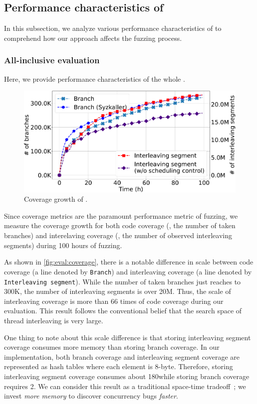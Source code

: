 \subsection{Performance characteristics of \sys}
\label{ss:characteristics}

In this subsection, we analyze various performance characteristics of
\sys to comprehend how our approach affects the fuzzing process.
%
\subsubsection{All-inclusive evaluation}
\label{sss:allinclusive}

Here, we provide performance characteristics of the whole \sys.


%
\begin{figure}[t]
  \centering
  \includegraphics[width=0.9\linewidth]{fig/coverage_graph-crop.pdf}
  \caption{Coverage growth of \sys.}
  \label{fig:eval:coverage}
\end{figure}
%
Since coverage metrics are the paramount performance metric of
fuzzing, we measure the coverage growth for both code coverage (\ie,
the number of taken branches) and interelaving coverage (\ie, the
number of observed interleaving segments) during 100 hours of fuzzing.

As shown in \autoref{fig:eval:coverage}, there is a notable difference
in scale between code coverage (a line denoted by \texttt{Branch}) and
interleaving coverage (a line denoted by \texttt{Interleaving segment}).
%
While the number of taken branches just reaches to 300K, the number of
interleaving segments is over 20M. Thus, the scale of interleaving
coverage is more than 66 times of code coverage during our evaluation.
%
This result follows the conventional belief that the search space of
thread interleaving is very large.

One thing to note about this scale difference is that storing
interleaving segment coverage consumes more memory than storing branch
coverage.
%
In our implementation, both branch coverage and interleaving segment
coverage are represented as hash tables where each element is
8-byte. Therefore, storing interleaving segment coverage consumes
about 180\MB while storing branch coverage requires 2\MB.
%
We can consider this result as a traditional space-time
tradeoff~\cite{spacetimetradeoff}; we invest \textit{more memory} to
discover concurrency bugs \textit{faster}.
%


